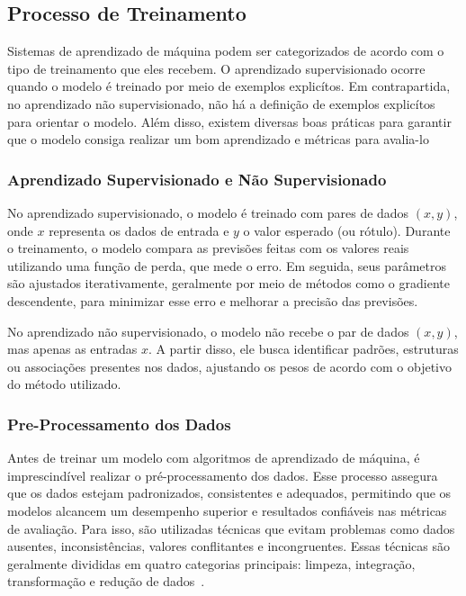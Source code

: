     \subsection{Processo de Treinamento}
        Sistemas de aprendizado de máquina podem ser categorizados de acordo com o tipo de treinamento que
        eles recebem. O aprendizado supervisionado ocorre quando o modelo é treinado por meio de exemplos explicítos. 
        Em contrapartida, no aprendizado não supervisionado, não há a definição de exemplos explicítos para orientar o 
        modelo. Além disso, existem diversas boas práticas para garantir que o modelo consiga realizar um bom aprendizado 
        e métricas para avalia-lo
         
        \subsubsection{Aprendizado Supervisionado e Não Supervisionado}  
            No aprendizado supervisionado, o modelo é treinado com pares de dados \((x,y)\), onde \(x\) representa 
            os dados de entrada e \(y\) o valor esperado (ou rótulo). Durante o treinamento, o modelo compara as 
            previsões feitas com os valores reais utilizando uma função de perda, que mede o erro. Em seguida, 
            seus parâmetros são ajustados iterativamente, geralmente por meio de métodos como o gradiente descendente, 
            para minimizar esse erro e melhorar a precisão das previsões.
            
            No aprendizado não supervisionado, o modelo não recebe o par de dados \((x,y)\), mas apenas as entradas 
            \(x\). A partir disso, ele busca identificar padrões, estruturas ou associações presentes nos dados, 
            ajustando os pesos de acordo com o objetivo do método utilizado.

        
        \subsubsection{Pre-Processamento dos Dados}
            Antes de treinar um modelo com algoritmos de aprendizado de máquina, é imprescindível realizar o pré-processamento 
            dos dados. Esse processo assegura que os dados estejam padronizados, consistentes e adequados, permitindo que os 
            modelos alcancem um desempenho superior e resultados confiáveis nas métricas de avaliação. Para isso, são utilizadas 
            técnicas que evitam problemas como dados ausentes, inconsistências, valores conflitantes e incongruentes. Essas 
            técnicas são geralmente divididas em quatro categorias principais: limpeza, integração, transformação e redução de 
            dados~\cite{silva2021, oliveira2024}.

